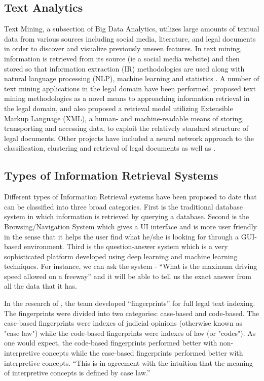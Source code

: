 \documentclass[11pt]{article}
\begin{document}
\subsection{Text Analytics}
Text Mining, a subsection of Big Data Analytics, utilizes large amounts of textual data from various sources including social media, literature, and legal documents in order to discover and visualize previously unseen features. In text mining, information is retrieved from its source (ie a social media website) and then stored so that information extraction (IR) methodologies are used along with natural language processing (NLP), machine learning and statistics \cite[p.~197]{LiuChenHo2015}.  A number of text mining applications in the legal domain have been performed. \cite{Moens2001} proposed text mining methodologies as a novel means to approaching information retrieval in the legal domain, and also proposed \cite{Moens2005} a retrieval model utilizing Extensible Markup Language (XML), a human- and machine-readable means of storing, transporting and accessing data, to exploit the relatively standard structure of legal documents. Other projects have included a neural network approach to the classification, clustering and retrieval of legal documents \cite{ChouHsing2010} as well as \cite{ChenLiuHo2013}.

\subsection{Types of Information Retrieval Systems}
Different types of Information Retrieval systems have been proposed to date that can be classified into three broad categories. First is the traditional database system in which information is retrieved by querying a database. Second is the Browsing/Navigation System which gives a UI interface and is more user friendly in the sense that it helps the user find what he/she is looking for through a GUI-based environment. Third is the question-answer system which is a very sophisticated platform developed using deep learning and machine learning techniques. For instance, we can ask the system - ``What is the maximum driving speed allowed on a freeway'' \cite{Moens2001} and it will be able to tell us the exact answer from all the data that it has.

In the research of \cite{Uijttenbroek2007}, the team developed ``fingerprints'' for full legal text indexing.  The fingerprints were divided into two categories:  case-based and code-based.  The case-based fingerprints were indexes of judicial opinions (otherwise known as "case law") while the code-based fingerprints were indexes of law (or "codes").  As one would expect, the code-based fingerprints performed better with non-interpretive concepts while the case-based fingerprints performed better with interpretive concepts.  ``This is in agreement with the intuition that the meaning of interpretive concepts is defined by case law.''  \cite[p.~299]{Uijttenbroek2007}
\end{document}
